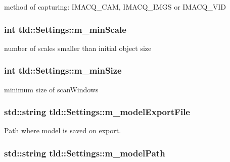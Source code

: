 method of capturing: IMACQ\_\-CAM, IMACQ\_\-IMGS or IMACQ\_\-VID 

\hypertarget{classtld_1_1_settings_a46e4d9f59b1f87508cf0ad9a154fdc21}{
\subsubsection[{m\_\-minScale}]{\setlength{\rightskip}{0pt plus 5cm}int {\bf tld::Settings::m\_\-minScale}}}
\label{classtld_1_1_settings_a46e4d9f59b1f87508cf0ad9a154fdc21}


number of scales smaller than initial object size 

\hypertarget{classtld_1_1_settings_aa08ffe8f36cb983224fadfd3d3b28391}{
\subsubsection[{m\_\-minSize}]{\setlength{\rightskip}{0pt plus 5cm}int {\bf tld::Settings::m\_\-minSize}}}
\label{classtld_1_1_settings_aa08ffe8f36cb983224fadfd3d3b28391}


minimum size of scanWindows 

\hypertarget{classtld_1_1_settings_a2fb70f5b39e773b64d62f902009827fc}{
\subsubsection[{m\_\-modelExportFile}]{\setlength{\rightskip}{0pt plus 5cm}std::string {\bf tld::Settings::m\_\-modelExportFile}}}
\label{classtld_1_1_settings_a2fb70f5b39e773b64d62f902009827fc}


Path where model is saved on export. 

\hypertarget{classtld_1_1_settings_ac09a844a6ee9727f04e2de086f4fa9ce}{
\subsubsection[{m\_\-modelPath}]{\setlength{\rightskip}{0pt plus 5cm}std::string {\bf tld::Settings::m\_\-modelPath}}}
\label{classtld_1_1_settings_ac09a844a6ee9727f04e2de086f4fa9ce}


